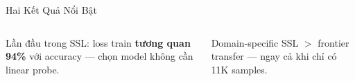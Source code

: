\documentclass[aspectratio=169,9pt]{beamer}
\begin{document}
\begin{frame}{Hai Kết Quả Nổi Bật}
\vspace{0.4em}
\begin{columns}[T]
\begin{primarybox}
\footnotesize Lần đầu trong SSL: loss train \textbf{tương quan 94\%} với accuracy — chọn model không cần linear probe.
\end{primarybox}

\begin{goodbox}
\footnotesize Domain-specific SSL $>$ frontier transfer — ngay cả khi chỉ có 11K samples.
\end{goodbox}
\end{columns}

\end{frame}


\end{document}
